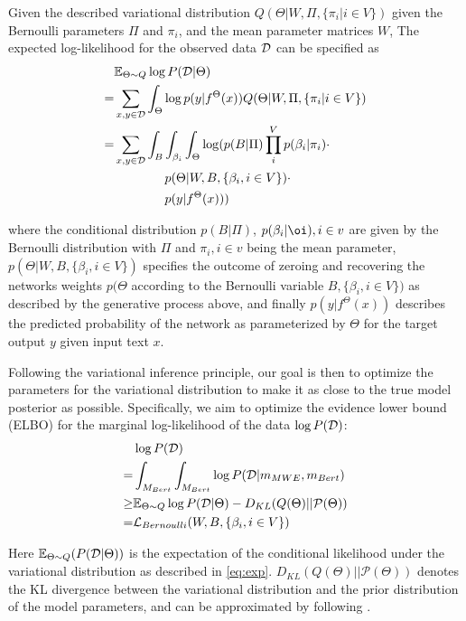 Given the described variational distribution $Q(\Theta | W, \Pi, \{\pi_i | i \in V\})$  given  
the Bernoulli parameters $\Pi$ and $\pi_i$, and the mean parameter matrices $W$,
The expected log-likelihood for the observed data $\mathcal{D}$  can be specified as 
\begin{align}
& \mathbb{E}_{\Theta \sim Q} \log P (\mathcalD | \Theta) \nonumber\\ 
= & \sum_{x, y \in \mathcalD} \int_{\Theta} \log p(y \vert f^{\Theta}(x)) Q(\Theta | W, \Pi, \{\pi_i | i \in V\}) \nonumber\\ 
= & \sum_{x, y \in \mathcalD} \int_B \int_{\beta_i}\int_{\Theta} \log ( p(B | \Pi) \prod_i^{V} p(\beta_i | \pi_i) \cdot \nonumber\\ 
& \quad \quad \quad \quad p(\Theta \vert W, B, \{\beta_i, i \in V\}) \cdot \nonumber\\ 
& \quad \quad \quad \quad p(y \vert f^{\Theta}(x)) )
\label{eq:exp}
\end{align}

where the conditional distribution 
$p(B | \Pi)$, $p(\beta_i | \oi), i\in v$ are given by the Bernoulli distribution with $\Pi$ and $\pi_i, i\in v$ being the mean parameter, 
$p(\Theta \vert W, B, \{\beta_i, i \in V\})$ specifies the outcome of zeroing and recovering the networks weights $p(\Theta$ according to the Bernoulli variable $B, \{\beta_i, i \in V\})$ as described by the generative process above,
and finally $p(y \vert f^{\Theta}(x))$ describes the predicted probability of the network as parameterized by $\Theta$ for the target output $y$ given input text $x$. 


Following the variational inference principle, our goal is then to optimize the parameters for the variational distribution to make it as close to the true model posterior as possible. Specifically, we aim to optimize the evidence lower bound (ELBO) for the marginal log-likelihood of the data $\log P( \mathcal{D} )$: 
\begin{align}
    &\log P( \mathcalD ) \nonumber\\
    = & \int_{M_{Bert}} \int_{M_{Bert}} \log P( \mathcalD | m_{MWE}, m_{Bert} ) \nonumber\\
    \geq& \mathbb{E}_{\Theta \sim Q} \log P (\mathcalD | \Theta) - D_{KL}(Q( \Theta) ||\mathcal{P}( \Theta)) \nonumber\\
    = & \mathcal{L}_{Bernoulli} (W, B, \{\beta_i, i \in V\}) \label{eq:elbo0}
\end{align}

Here $\mathbb{E}_{\Theta \sim Q} (P (\mathcal{D} | \Theta) )$ is the expectation of the conditional likelihood under the variational distribution as described in \autoref{eq:exp}. $D_{KL}(Q( \Theta) ||\mathcal{P}( \Theta))$ denotes the KL divergence between the variational distribution and the prior distribution of the model parameters, and can be approximated by following \cite{gal2016uncertainty}.
%


